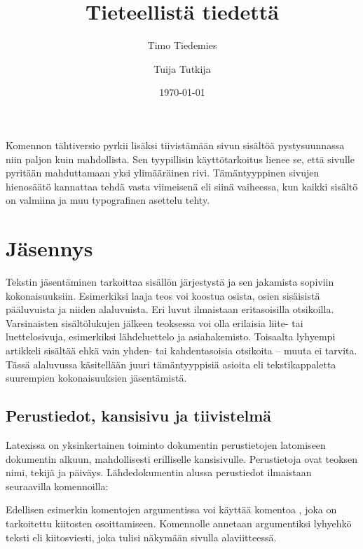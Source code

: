 \noindent
Komennon tähtiversio  pyrkii lisäksi
tiivistämään sivun sisältöä pystysuunnassa niin paljon kuin mahdollista.
Sen tyypillisin käyttötarkoitus lienee se, että sivulle pyritään
mahduttamaan yksi ylimääräinen rivi. Tämäntyyppinen sivujen hienosäätö
kannattaa tehdä vasta viimeisenä eli siinä vaiheessa, kun kaikki sisältö
on valmiina ja muu typografinen asettelu tehty.

\section{Jäsennys}
\label{luku/jäsennys}

Tekstin jäsentäminen tarkoittaa sisällön järjestystä ja sen jakamista
sopiviin kokonaisuuksiin. Esimerkiksi laaja teos voi koostua osista,
osien sisäisistä pääluvuista ja niiden alaluvuista. Eri luvut ilmaistaan
eritasoisilla otsikoilla. Varsinaisten sisältölukujen jälkeen teoksessa
voi olla erilaisia liite- tai luettelosivuja, esimerkiksi lähdeluettelo
ja asiahakemisto. Toisaalta lyhyempi artikkeli sisältää ehkä vain yhden-
tai kahdentasoisia otsikoita -- muuta ei tarvita. Tässä alaluvussa
käsitellään juuri tämäntyyppisiä asioita eli tekstikappaletta suurempien
kokonaisuuksien jäsentämistä.

\subsection{Perustiedot, kansisivu ja tiivistelmä}
\label{luku/dokumentin-perustiedot}

Latexissa on yksinkertainen toiminto dokumentin perustietojen latomiseen
dokumentin alkuun, mahdollisesti erilliselle kansisivulle. Perustietoja
ovat teoksen nimi, tekijä ja päiväys. Lähdedokumentin alussa perustiedot
ilmaistaan seuraavilla komennoilla:

\begin{koodilohkosis}
\title{Tieteellistä tiedettä}              %
\author{Timo Tiedemies \and Tuija Tutkija} %
\date{\today}                              %
\end{koodilohkosis}

\noindent
Edellisen esimerkin komentojen argumentissa voi käyttää komentoa
, joka on tarkoitettu kiitosten osoittamiseen.
Komennolle annetaan argumentiksi lyhyehkö teksti eli kiitosviesti, joka
tulisi näkymään sivulla alaviitteessä.

